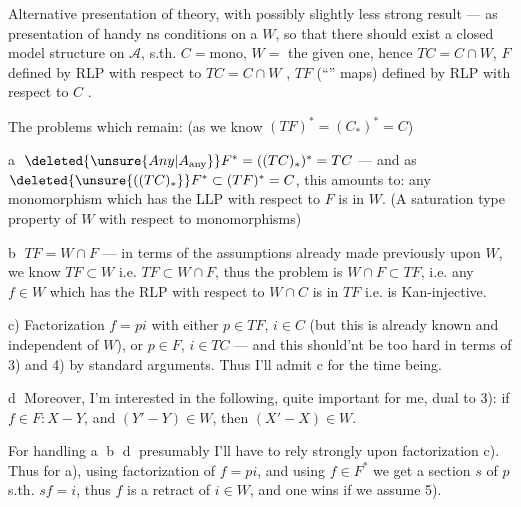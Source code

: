 
Alternative presentation of theory, with possibly slightly less strong result --- as presentation of handy ns conditions on a $W$, so that there should exist a closed model structure on $\mathscr A$, s.th. $C=\mathrm{mono}$, $W=$ the given one, hence $TC=C\cap W$, $F$ defined by  RLP with respect to $TC=C\cap W$ , $TF$ (``'' maps) defined by RLP with respect to $C$ .

The problems which remain: (as we know  $(TF)^*=(C_*)^*=C$)

\textcircled{a} $\deleted{\unsure{Any|A_{\text{any}}}}F^*=((TC)_*)^*=TC$ --- and as $\deleted{\unsure{((TC)_*}}F^*\subset(TF)^*=C$, this amounts to: any monomorphism which has the LLP with respect to $F$ is in $W$. (A saturation type property of $W$ with respect to monomorphisms)

\textcircled{b} $TF=W\cap F$ --- in terms of the assumptions already made previously upon $W$, we know $TF\subset W$ i.e. $TF\subset W\cap F$, thus the problem is $W\cap F\subset TF$, i.e. any $f\in W$ which has the RLP with respect to $W\cap C$ is in $TF$ i.e. is Kan-injective.

c) Factorization $f=pi$ with either $p\in TF$, $i\in C$ (but this is already known and independent of $W$), or $p\in F$, $i\in TC$  --- and this should'nt be too hard in terms of 3) and 4) by standard arguments. Thus I'll admit c for the time being.

\textcircled{d} Moreover, I'm interested in the following, quite important for me, dual to 3): if $f\in F:X-Y$, and $(Y'-Y)\in W$, then $(X'-X)\in W$.

For handling \textcircled{a} \textcircled{b} \textcircled{d} presumably I'll have to rely strongly upon factorization c). Thus for a), using factorization of $f=pi$, and using $f\in F^*$ we get a section $s$ of $p$  s.th. $sf=i$, thus $f$ is a retract of $i\in W$, and one wins if we assume 5).
